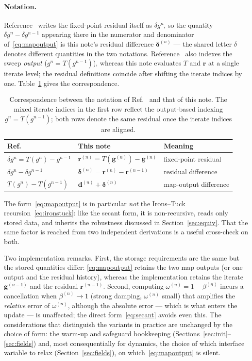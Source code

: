 \documentclass[11pt]{article}
\begin{document}
\paragraph{Notation.} Reference~\cite{Koliesnikova} writes the
fixed-point residual itself as $\delta g^{n}$, so the quantity
$\delta g^{n} - \delta g^{n-1}$ appearing there in the numerator and
denominator of~\eqref{eq:mapoutput} is this note's residual difference
$\bm{\delta}^{(n)}$ --- the shared letter $\delta$ denotes different
quantities in the two notations. Reference~\cite{Koliesnikova} also
indexes the sweep \emph{output} ($g^{n} = T(g^{n-1})$), whereas this
note evaluates $T$ and $\bm{r}$ at a single iterate level; the residual
definitions coincide after shifting the iterate indices by one.
Table~\ref{tab:translation} gives the correspondence.

\begin{table}[ht!]
\centering
\small
\begin{tabular}{@{}lll@{}}
\toprule
Ref.~\cite{Koliesnikova} & This note & Meaning \\
\midrule
$\delta g^{n} = T(g^{n}) - g^{n-1}$ &
$\bm{r}^{(n)} = T(\bm{g}^{(n)}) - \bm{g}^{(n)}$ &
fixed-point residual \\
$\delta g^{n} - \delta g^{n-1}$ &
$\bm{\delta}^{(n)} = \bm{r}^{(n)} - \bm{r}^{(n-1)}$ &
residual difference \\
$T(g^{n}) - T(g^{n-1})$ &
$\bm{d}^{(n)} + \bm{\delta}^{(n)}$ &
map-output difference \\
\bottomrule
\end{tabular}
\caption{Correspondence between the notation of
Ref.~\cite{Koliesnikova} and that of this note. The mixed iterate
indices in the first row reflect the output-based indexing
$g^{n} = T(g^{n-1})$; both rows denote the same residual once the
iterate indices are aligned.}
\label{tab:translation}
\end{table}

The form~\eqref{eq:mapoutput} is in particular \emph{not} the Irons--Tuck
recursion~\eqref{eq:ironstuck}: like the secant form, it is non-recursive,
reads only stored data, and inherits the robustness discussed in
Section~\ref{sec:equiv}. That the same factor is reached from two
independent derivations is a useful cross-check on both.

Two implementation remarks. First, the storage requirements are the same
but the stored quantities differ: \eqref{eq:mapoutput} retains the two map
outputs (or one output and the residual history), whereas the
implementation retains the iterate $\bm{g}^{(n-1)}$ and the residual
$\bm{r}^{(n-1)}$. Second, computing $\omega^{(n)} = 1 - \beta^{(n)}$
incurs a cancellation when $\beta^{(n)} \to 1$ (strong damping,
$\omega^{(n)}$ small) that amplifies the \emph{relative} error of
$\omega^{(n)}$, although the absolute error --- which is what enters the
update --- is unaffected; the direct form~\eqref{eq:secant} avoids even
this. The considerations that distinguish the variants in practice are
unchanged by the choice of form: the warm-up and safeguard bookkeeping
(Sections~\ref{sec:init}--\ref{sec:fields}) and, most consequentially for
dynamics, the choice of which interface variable to relax
(Section~\ref{sec:fields}), on which~\eqref{eq:mapoutput} is silent.
\end{document}
